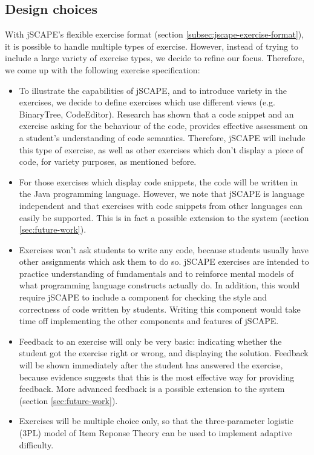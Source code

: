 \subsection{Design choices}
With jSCAPE's flexible exercise format (section \ref{subsec:jscape-exercise-format}), it is possible to handle multiple types of exercise. However, instead of trying to include a large variety of exercise types, we decide to refine our focus. Therefore, we come up with the following exercise specification:
\begin{itemize}
\item To illustrate the capabilities of jSCAPE, and to introduce variety in the exercises, we decide to define exercises which use different views (e.g. \textsf{BinaryTree}, \textsf{CodeEditor}). Research\cite{Lister} has shown that a code snippet and an exercise asking for the behaviour of the code, provides effective assessment on a student's understanding of code semantics. Therefore, jSCAPE will include this type of exercise, as well as other exercises which don't display a piece of code, for variety purposes, as mentioned before.
\item For those exercises which display code snippets, the code will be written in the Java programming language. However, we note that jSCAPE is language independent and that exercises with code snippets from other languages can easily be supported. This is in fact a possible extension to the system (section \ref{sec:future-work}).
\item Exercises won't ask students to write any code, because students usually have other assignments which ask them to do so. jSCAPE exercises are intended to practice understanding of fundamentals and to reinforce mental models of what programming language constructs actually do. In addition, this would require jSCAPE to include a component for checking the style and correctness of code written by students. Writing this component would take time off implementing the other components and features of jSCAPE.
\item Feedback to an exercise will only be very basic: indicating whether the student got the exercise right or wrong, and displaying the solution. Feedback will be shown immediately after the student has answered the exercise, because evidence\cite{Mitrovic} suggests that this is the most effective way for providing feedback. More advanced feedback is a possible extension to the system (section \ref{sec:future-work}).
\item Exercises will be multiple choice only, so that the three-parameter logistic (3PL) model of Item Reponse Theory can be used to implement adaptive difficulty.
\end{itemize}

